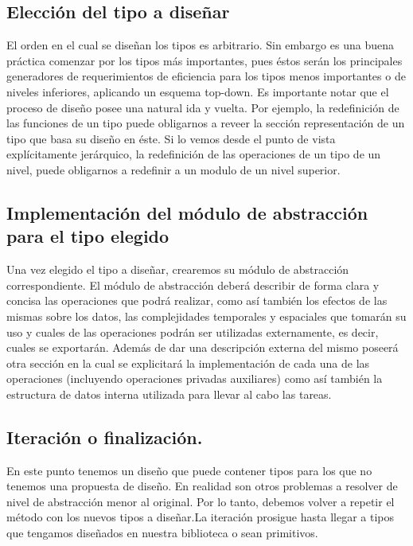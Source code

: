 \subsection{Elecci\'on del tipo a dise\~nar}

El orden en el cual se dise\~nan los tipos es arbitrario. Sin embargo es una buena pr\'actica comenzar por los tipos m\'as importantes, pues \'estos ser\'an los principales generadores de requerimientos de eficiencia para los tipos menos importantes o de niveles inferiores, aplicando un esquema top-down. Es importante notar que el proceso de dise\~no posee una natural ida y vuelta. Por ejemplo, la redefinici\'on de las funciones de un tipo puede obligarnos a reveer la secci\'on representaci\'on de un tipo que basa su dise\~no en \'este. Si lo vemos desde el punto de vista expl\'icitamente jer\'arquico, la redefinici\'on de las operaciones de un tipo de un nivel, puede obligarnos a redefinir a un modulo de un nivel superior.

\subsection{Implementaci\'on del m\'odulo de abstracci\'on para el tipo elegido}

Una vez elegido el tipo a dise\~nar, crearemos su m\'odulo de abstracci\'on correspondiente. El m\'odulo de abstracci\'on deber\'a describir de forma clara y concisa las operaciones que podr\'a realizar, como as\'i tambi\'en los efectos de las mismas sobre los datos, las complejidades temporales y espaciales que tomar\'an su uso y cuales de las operaciones podr\'an ser utilizadas externamente, es decir, cuales se exportar\'an. Adem\'as de dar una descripci\'on externa del mismo poseer\'a otra secci\'on en la cual se explicitar\'a la implementaci\'on de cada una de las operaciones (incluyendo operaciones privadas auxiliares) como as\'i tambi\'en la estructura de datos interna utilizada para llevar al cabo las tareas.

\subsection{Iteraci\'on o finalizaci\'on.}
En este punto tenemos un dise\~no que puede contener tipos para los que no tenemos una propuesta de dise\~no. En realidad son otros problemas a resolver de nivel de abstracci\'on menor al original. Por lo tanto, debemos volver a repetir el m\'etodo con los nuevos tipos a dise\~nar.La iteraci\'on prosigue hasta llegar a tipos que tengamos dise\~nados en nuestra biblioteca o sean primitivos.

